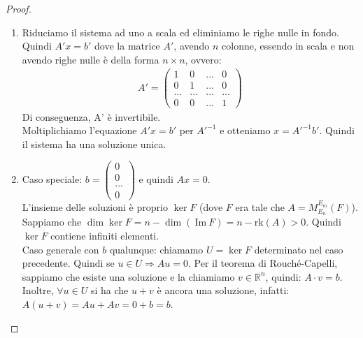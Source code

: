 \documentclass[a4paper]{article}
\newcommand{\IM}{\ \mathrm{Im} \ }
\theoremstyle{definition}
\begin{document}
	\begin{proof}
		\begin{enumerate}
			\item Riduciamo il sistema ad uno a scala ed eliminiamo le righe nulle in fondo. \\
				Quindi $A'x = b'$ dove la matrice $A'$, avendo $n$ colonne, essendo in scala e non avendo righe nulle è della forma $n \times n$, ovvero:
				\begin{align*}
					A' = \begin{pmatrix}
						1 & 0 & ... & 0 \\
						0 & 1 & ... & 0 \\
						... & ... & ... & ... \\
						0 & 0 & ... & 1
					\end{pmatrix}
				\end{align*}
				Di conseguenza, A' è invertibile. \\
				Moltiplichiamo l'equazione $A'x = b'$ per $A'^{-1}$ e otteniamo $x = A'^{-1}b'$.
				Quindi il sistema ha una soluzione unica.
			\item Caso speciale: $b = \begin{pmatrix}
				0 \\
				0 \\
				... \\
				0
			\end{pmatrix}$ e quindi $Ax = 0$. \\
			L'insieme delle soluzioni è proprio $\ker F$ (dove $F$ era tale che $A = M_{E_n}^{E_m}(F)$).
			Sappiamo che $\dim \ker F = n - \dim(\IM F) = n - \text{rk}(A) > 0$. Quindi $\ker F$ contiene infiniti elementi. \\
			Caso generale con $b$ qualunque: chiamamo $U = \ker F$ determinato nel caso precedente. Quindi se $u \in U \Rightarrow Au = 0$.
			Per il teorema di Rouché-Capelli, sappiamo che esiste una soluzione e la chiamiamo $v \in \mathbb{R}^n$, quindi:
			$A \cdot v = b$. \\
			Inoltre, $\forall u \in U$ si ha che $u + v$ è ancora una soluzione, infatti:
			$A(u + v) = Au + Av = 0 + b = b$.
		\end{enumerate}
	\end{proof}
\end{document}
